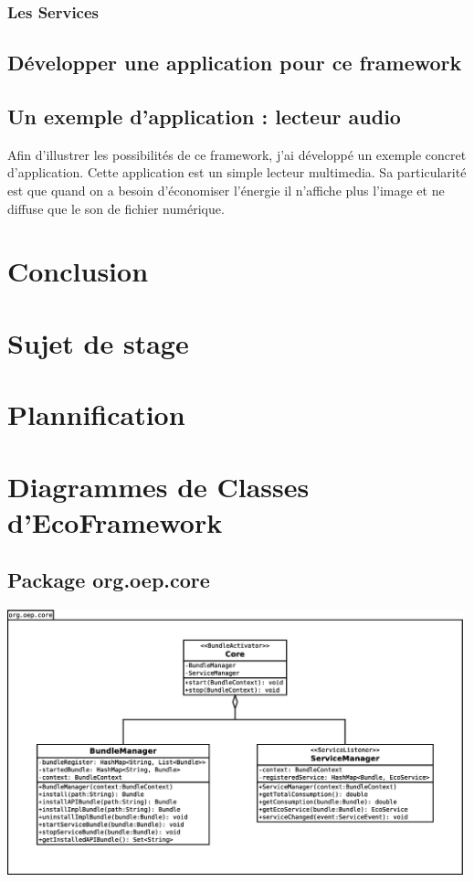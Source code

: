 \documentclass[a4paper, 11pt]{report}
\begin{document}
		\subsection{Les Services}
 
	\section{Développer une application pour ce framework}

	
	\section{Un exemple d'application : lecteur audio}
Afin d'illustrer les possibilités de ce framework, j'ai développé un exemple concret d'application. Cette application est un simple lecteur multimedia. Sa particularité est que quand on a besoin d'économiser l'énergie il n'affiche plus l'image et ne diffuse que le son de fichier numérique.

\chapter{Conclusion}



\listoffigures{}
\listoftables{}
\appendix

\chapter{Sujet de stage}


\chapter{Plannification}

\chapter{Diagrammes de Classes d'EcoFramework}
\section{Package org.oep.core}
	\begin{centering}
		\includegraphics[width=0.99\textwidth]{figures/EcoPattern_Core_Classes.eps}
	\end{centering}
\end{document}
